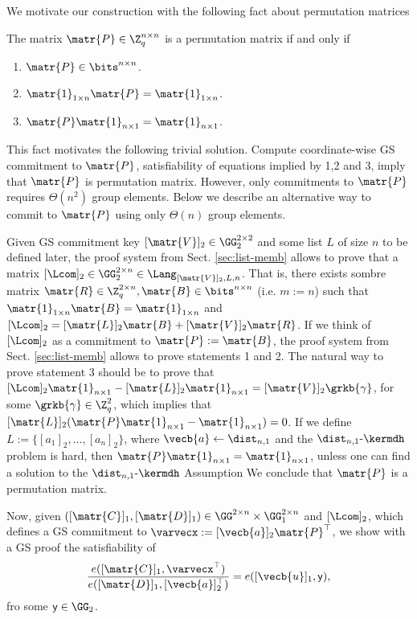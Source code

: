 We motivate our construction with the following fact about permutation matrices

\begin{fact} The matrix $\matr{P}\in\Z_q^{n\times n}$ is a permutation matrix if and only if
\begin{enumerate}
    \item $\matr{P}\in\bits^{n\times n}$.
    \item $\matr{1}_{1\times n}\matr{P}=\matr{1}_{1\times n}$.
    \item $\matr{P}\matr{1}_{n\times 1}= \matr{1}_{n\times 1}$.
\end{enumerate}
\end{fact}

This fact motivates the following trivial solution. Compute coordinate-wise GS commitment to $\matr{P}$, satisfiability of equations implied by 1,2 and 3, imply that $\matr{P}$ is permutation matrix. However, only commitments to $\matr{P}$ requires $\Theta(n^2)$ group elements. Below we describe an alternative way to commit to $\matr{P}$ using only $\Theta(n)$ group elements.

Given GS commitment key $[\matr{V}]_2\in\GG_2^{2\times 2}$ and some list $L$ of size $n$ to be defined later, the proof system from Sect. \ref{sec:list-memb} allows to prove that a matrix $[\Lcom]_2\in\GG_2^{2\times n}\in\Lang_{[\matr{V}]_2,L,n}$. That is, there exists sombre matrix $\matr{R}\in\Z_q^{2\times n},\matr{B}\in\bits^{n\times n}$ (i.e. $m:=n$) such that $\matr{1}_{1\times n}\matr{B}=\matr{1}_{1\times n}$ and $[\Lcom]_2 = [\matr{L}]_2\matr{B}+[\matr{V}]_2\matr{R}$. If we think of $[\Lcom]_2$ as a commitment to $\matr{P}:=\matr{B}$, the proof system from Sect. \ref{sec:list-memb} allows to prove statements 1 and 2. The natural way to prove statement 3 should be
to prove that $
[\Lcom]_2\matr{1}_{n\times 1}-[\matr{L}]_2\matr{1}_{n\times 1} = [\matr{V}]_2\grkb{\gamma}
$, for some $\grkb{\gamma}\in\Z_q^2$, which implies that $[\matr{L}]_2(\matr{P}\matr{1}_{n\times 1}-\matr{1}_{n\times 1})=0$. If we define $L:=\{[a_1]_2,\ldots,[a_n]_2\}$, where $\vecb{a}\gets \dist_{n,1}$ and the $\dist_{n,1}\mbox{-}\kermdh$ problem is hard, then $\matr{P}\matr{1}_{n\times 1}=\matr{1}_{n\times 1}$, unless one can find a solution to the $\dist_{n,1}\mbox{-}\kermdh$ Assumption We conclude that $\matr{P}$ is a permutation matrix.

Now, given $([\matr{C}]_1,[\matr{D}]_1)\in\GG^{2\times n}\times\GG_1^{2\times n}$ and $[\Lcom]_2$, which defines a GS commitment to $\varvecx:=[\vecb{a}]_2\matr{P}^\top$, we show with a GS proof the satisfiability of
\begin{equation}
\dfrac{e([\matr{C}]_1,\varvecx^\top)}{e([\matr{D}]_1,[\vecb{a}]_2^\top)}
=
e([\vecb{u}]_1,\mathsf{y}),
\label{eq:shuffle}
\end{equation}
fro some $\mathsf{y}\in\GG_2$.


